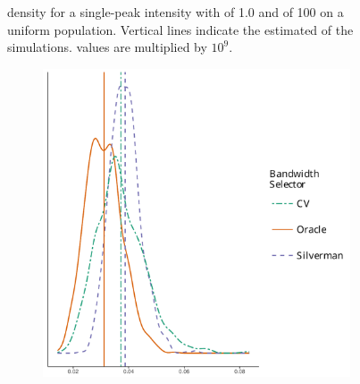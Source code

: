 \begin{figure}[htbp]
\begin{subfigure}[b]{0.45\textwidth}
    \end{subfigure}
    \caption[: Single-peak of 100 on uniform population]{ density for a single-peak intensity with  of 1.0 and  of 100 on a uniform population. Vertical lines indicate the estimated  of the simulations.  values are multiplied by $10^9$.}
    \label{fig:ise:unif_100_1.0_1h}
\end{figure}

\begin{figure}[htbp]
    \centering
    \begin{subfigure}[b]{0.45\textwidth}
        \includegraphics[width=\textwidth]{output/iae-relative-histogram}
    \end{subfigure}
    \begin{subfigure}[b]{0.45\textwidth}

\end{subfigure}
\end{figure}
